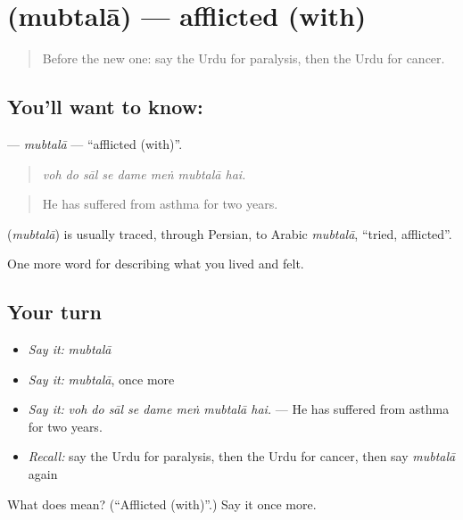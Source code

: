 \section[\texorpdfstring{\ur{مبتلا} (mubtalā)}{مبتلا (mubtalā)}]{ (mubtalā) — afflicted (with)}

\label{lesson:UR-C475-mubtala}



\begin{quote}
Before the new one: say the Urdu for paralysis, then the Urdu for cancer.
\end{quote}

\subsection*{You'll want to know: }
\textbf{} — \emph{mubtalā} — \textquotedblleft{}afflicted (with)\textquotedblright{}.

\begin{quote}
       
\end{quote}

\begin{quote}
\emph{voh do sāl se dame meṅ mubtalā hai.}
\end{quote}

\begin{quote}
He has suffered from asthma for two years.
\end{quote}

\begin{cousinweb}
\textbf{} (\emph{mubtalā}) is usually traced, through Persian, to Arabic \emph{mubtalā}, \textquotedblleft{}tried, afflicted\textquotedblright{}.
\end{cousinweb}

\begin{grammarlens}[title={What you've built}]
One more word for describing what you lived and felt.
\end{grammarlens}

\subsection*{Your turn}
\begin{itemize}
\raggedright
  \item \emph{Say it:} \emph{mubtalā}
  \item \emph{Say it:} \emph{mubtalā}, once more
  \item \emph{Say it:} \emph{voh do sāl se dame meṅ mubtalā hai.} — He has suffered from asthma for two years.
  \item \emph{Recall:} say the Urdu for paralysis, then the Urdu for cancer, then say \emph{mubtalā} again
\end{itemize}

\begin{tcolorbox}[breakable,colback=teal!4,colframe=teal!35!black,title={Before you move on}]
What does  mean? (\textquotedblleft{}Afflicted (with)\textquotedblright{}.) Say it once more.
\end{tcolorbox}
